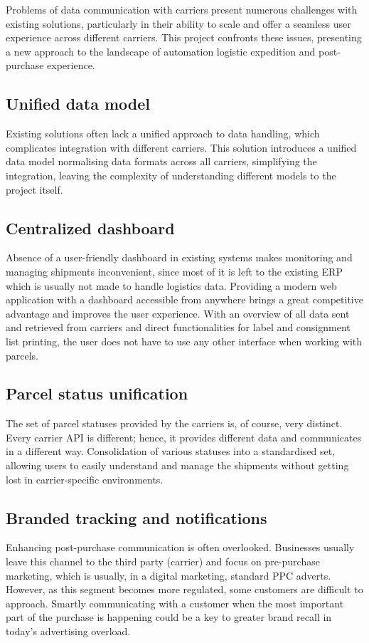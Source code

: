 Problems of data communication with carriers present numerous challenges with existing solutions, particularly in their ability to scale and offer a seamless user experience across different carriers.
This project confronts these issues, presenting a new approach to the landscape of automation logistic expedition and post-purchase experience.

\subsection{Unified data model}
Existing solutions often lack a unified approach to data handling, which complicates integration with different carriers. 
This solution introduces a unified data model normalising data formats across all carriers, simplifying the integration, leaving the complexity of understanding different models to the project itself.

\subsection{Centralized dashboard}
Absence of a user-friendly dashboard in existing systems makes monitoring and managing shipments inconvenient, since most of it is left to the existing ERP which is usually not made to handle logistics data.
Providing a modern web application with a dashboard accessible from anywhere brings a great competitive advantage and improves the user experience. 
With an overview of all data sent and retrieved from carriers and direct functionalities for label and consignment list printing, the user does not have to use any other interface when working with parcels.

\subsection{Parcel status unification}
The set of parcel statuses provided by the carriers is, of course, very distinct. Every carrier API is different; hence, it provides different data and communicates in a different way.
Consolidation of various statuses into a standardised set, allowing users to easily understand and manage the shipments without getting lost in carrier-specific environments.

\subsection{Branded tracking and notifications}
Enhancing post-purchase communication is often overlooked.
Businesses usually leave this channel to the third party (carrier) and focus on pre-purchase marketing, which is usually, in a digital marketing, standard \ac{PPC} adverts. 
However, as this segment becomes more regulated, some customers are difficult to approach.
Smartly communicating with a customer when the most important part of the purchase is happening could be a key to greater brand recall in today's advertising overload. 

